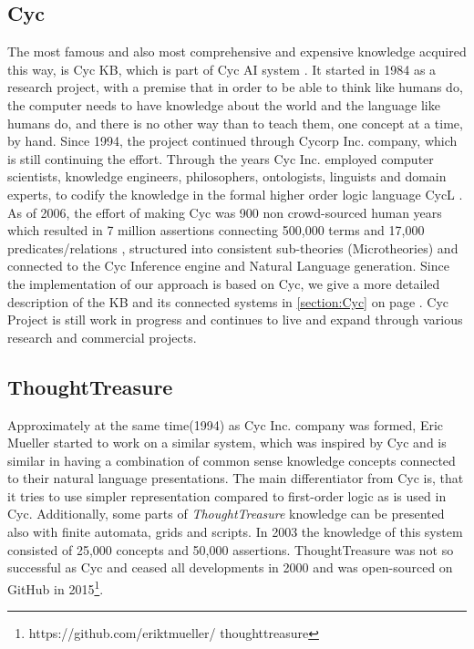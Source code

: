 \subsection{Cyc}
\label{section:relatedcyc}
 The most famous and also most comprehensive and expensive 
knowledge acquired this way, is Cyc KB, which is part of Cyc AI system 
\parencite{Lenat1995}. It started in 1984 as a research project, with a premise 
that in order to be able to think like humans do, the computer needs to have 
knowledge about the world and the language like humans do, and there is no other
way than to teach them, one concept at a time, by hand. Since 1994, the project 
continued through Cycorp Inc. company, which is still continuing the effort. 
Through the years Cyc Inc. employed computer scientists, knowledge engineers, 
philosophers, ontologists, linguists and domain experts, to codify the knowledge
in the formal higher order logic language CycL \parencite{Matuszek2006}. As of 
2006, the effort of making Cyc was 900 non crowd-sourced 
human years which resulted in 7 million assertions connecting 500,000 terms and 
17,000 predicates/relations \parencite{Zang2013}, structured into consistent 
sub-theories (Microtheories) and connected to the Cyc Inference engine and 
Natural Language generation. Since the implementation of our approach is based
on Cyc, we give a more detailed description of the KB and its connected systems
in \autoref{section:Cyc} on page \pageref{section:Cyc}. Cyc Project is still 
work in progress and continues to live and expand through various research and
commercial projects.

\subsection{ThoughtTreasure}
\label{section:r:thought}
 Approximately at the same time(1994) as Cyc Inc. 
company was formed, Eric Mueller started to work on a similar system, which was
inspired by Cyc and is similar in having a combination of common sense knowledge
concepts connected to their natural language presentations. The main 
differentiator from Cyc is, that it tries to use simpler representation compared
to first-order logic as is used in Cyc. Additionally, some parts of 
\emph{ThoughtTreasure} knowledge can be presented also with finite automata, 
grids and scripts\parencite{Mueller1999,Mueller2003}. In 2003 the knowledge of
this system consisted of 25,000 concepts and 50,000 assertions. ThoughtTreasure 
was not so successful as Cyc and ceased all developments in 2000 and was 
open-sourced on GitHub in 2015\footnote{https://github.com/eriktmueller/
thoughttreasure}. 

